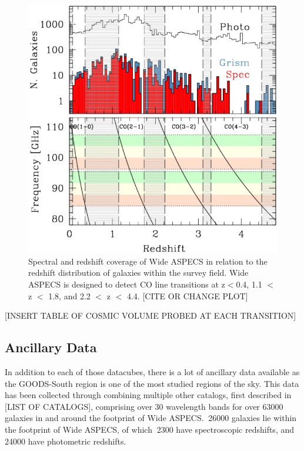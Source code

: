 \begin{figure}[tbp]
\centering
\includegraphics[width=120mm]{Wide_ASPECS_Freq.png}
\caption{Spectral and redshift coverage of Wide ASPECS in relation to the redshift distribution of galaxies within the survey field. Wide ASPECS is designed to detect CO line transitions at z$<$0.4, 1.1 $<$ z $<$ 1.8, and 2.2 $<$ z $<$ 4.4. [CITE OR CHANGE PLOT]}
\label{fig:ASPECS_Freq}
\end{figure}

[INSERT TABLE OF COSMIC VOLUME PROBED AT EACH TRANSITION]

\subsection{Ancillary Data}

In addition to each of those datacubes, there is a lot of ancillary data available as the GOODS-South region is one of the most studied regions of the sky. This data has been collected through combining multiple other catalogs, first described in [LIST OF CATALOGS], comprising over 30 wavelength bands for over 63000 galaxies in and around the footprint of Wide ASPECS. $~$26000 galaxies lie within the footprint of Wide ASPECS, of which $~$2300 have spectroscopic redshifts, and $~$24000 have photometric redshifts. 

